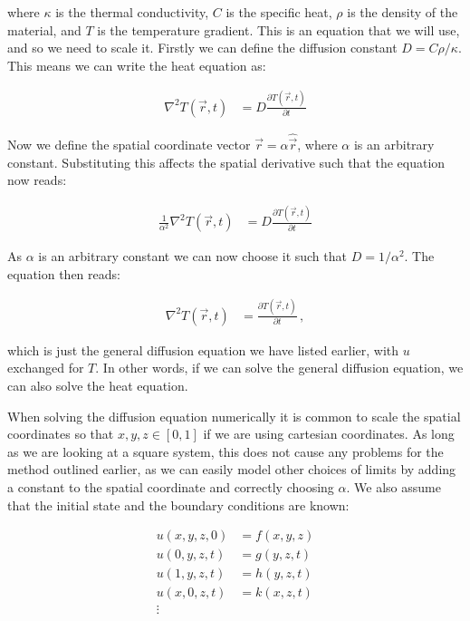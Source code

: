 \documentclass[reprint,english,notitlepage]{revtex4-1}  %
\begin{document}
where $\kappa$ is the thermal conductivity, $C$ is the specific heat, $\rho$ is the density of the material, and $T$ is the temperature gradient. This is an equation that we will use, and so we need to scale it. Firstly we can define the diffusion constant $D = C\rho/\kappa$. This means we can write the heat equation as:

\begin{align*}
\nabla^2 T(\vec{r},t) &= D \frac{\partial T(\vec{r},t)}{\partial t}
\end{align*}

Now we define the spatial coordinate vector $\vec{r} = \alpha \hat{\vec{r}}$, where $\alpha$ is an arbitrary constant. Substituting this affects the spatial derivative such that the equation now reads:

\begin{align*}
\frac{1}{\alpha^2} \nabla^2 T(\vec{r},t) &= D \frac{\partial T(\vec{r},t)}{\partial t}
\end{align*}  

As $\alpha$ is an arbitrary constant we can now choose it such that $D = 1/\alpha^2$. The equation then reads:

\begin{align*}
\nabla^2 T(\vec{r},t) &= \frac{\partial T(\vec{r},t)}{\partial t} \, ,
\end{align*}

which is just the general diffusion equation we have listed earlier, with $u$ exchanged for $T$. In other words, if we can solve the general diffusion equation, we can also solve the heat equation.

When solving the diffusion equation numerically it is common to scale the spatial coordinates so that $x,y,z \in [0,1]$ if we are using cartesian coordinates. As long as we are looking at a square system, this does not cause any problems for the method outlined earlier, as we can easily model other choices of limits by adding a constant to the spatial coordinate and correctly choosing $\alpha$. We also assume that the initial state and the boundary conditions are known: 

\begin{align*}
u(x,y,z,0) &= f(x,y,z) \\
u(0,y,z,t) &= g(y,z,t) \\
u(1,y,z,t) &= h(y,z,t) \\
u(x,0,z,t) &= k(x,z,t) \\
\vdots 
\end{align*}
\end{document}
